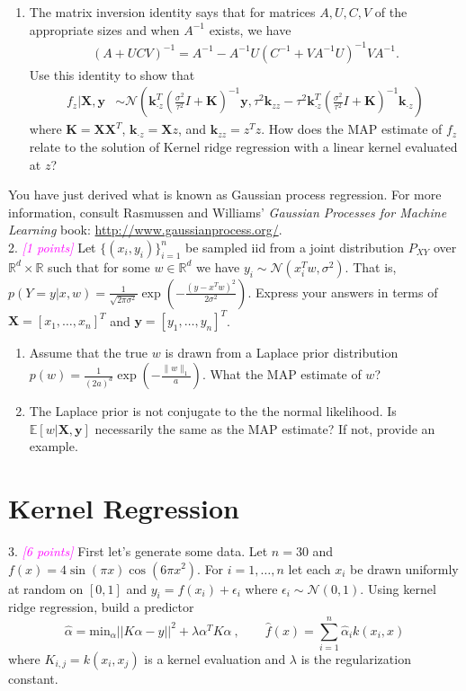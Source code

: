 \documentclass{article}
\newcommand{\field}[1]{\mathbb{#1}}
\newcommand{\mb}[1]{\mathbf{#1}}
\newcommand{\1}{\mathbf{1}}
\newcommand{\E}{\mathbb{E}} %
\newcommand{\R}{\field{R}} %
\newcommand{\grade}[1]{\small\textcolor{magenta}{\emph{[#1 points]}} \normalsize}
\begin{document}
\begin{enumerate}
  \item The matrix inversion identity says that for matrices $A, U, C, V$ of the appropriate sizes and when $A^{-1}$ exists, we have
  \begin{align*}
    (A+UCV)^{-1} = A^{-1} - A^{-1} U (C^{-1} + V A^{-1} U)^{-1} V A^{-1}.
  \end{align*}
  Use this identity to show that
  \begin{align*}
    f_z | \mb{X},\mb{y} &\sim \mathcal{N}(\mb{k}_{\cdot z}^T( \tfrac{\sigma^2}{\tau^2} I+ \mb{K})^{-1} \mb{y} , \tau^2 \mb{k}_{zz} - \tau^2 \mb{k}_{\cdot z}^T( \tfrac{\sigma^2}{\tau^2} I+ \mb{K})^{-1}\mb{k}_{\cdot z})
  \end{align*}
  where $\mb{K} = \mb{X} \mb{X}^T$, $\mb{k}_{\cdot z} = \mb{X} z$, and $\mb{k}_{zz} = z^T z$.
  How does the MAP estimate of $f_z$ relate to the solution of Kernel ridge regression with a linear kernel evaluated at $z$? 
\end{enumerate}
You have just derived what is known as Gaussian process regression. 
For more information, consult Rasmussen and Williams' \textit{Gaussian Processes for Machine Learning} book: \url{http://www.gaussianprocess.org/}.\\ 

2. \grade{1} Let $\{(x_i,y_i)\}_{i=1}^n$ be sampled iid from a joint distribution $P_{XY}$ over $\R^d \times \R$ such that for some $w \in \R^d$ we have $y_i \sim \mathcal{N}(x_i^T w,\sigma^2)$. That is, $p(Y =y | x, w) = \frac{1}{\sqrt{2\pi\sigma^2}} \exp(-\frac{(y-x^T w)^2}{2\sigma^2})$. Express your answers in terms of $\mb{X} = [x_1,\dots,x_n]^T$ and $\mb{y} = [y_1,\dots,y_n]^T$.
\begin{enumerate}
  \item Assume that the true $w$ is drawn from a Laplace prior distribution $p(w) = \frac{1}{(2a)^d} \exp(-\frac{\|w\|_1}{a})$. What the MAP estimate of $w$?
  \item The Laplace prior is not conjugate to the the normal likelihood. Is $\E[w | \mb{X}, \mb{y} ]$ necessarily the same as the MAP estimate? If not, provide an example.  
\end{enumerate}



\section{Kernel Regression}

3. \grade{6} First let's generate some data. Let $n=30$ and $f(x) = 4 \sin(\pi x)\cos(6\pi x^2)$. For $i=1,\dots,n$ let each $x_i$ be drawn uniformly at random on $[0,1]$ and $y_i = f(x_i) + \epsilon_i$ where $\epsilon_i \sim \mathcal{N}(0,1)$.
Using kernel ridge regression, build a predictor
\[
  \widehat{\alpha} = \mbox{min}_\alpha ||K\alpha - y||^2 + \lambda \alpha^T K \alpha \ , \quad \quad \widehat{f}(x)=\sum_{i=1}^n \widehat{\alpha}_i k(x_i,x) 
\]
where $K_{i,j} = k(x_i,x_j)$ is a kernel evaluation and $\lambda$ is the regularization constant. 
\end{document}
